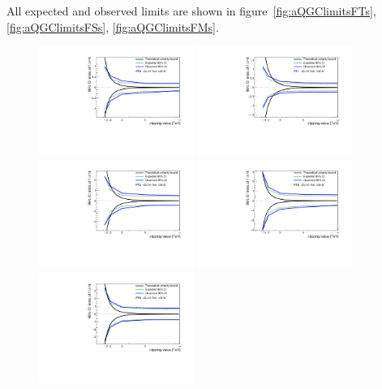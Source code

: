 All expected and observed limits are shown in figure~\ref{fig:aQGClimitsFTs}, \ref{fig:aQGClimitsFSs}, \ref{fig:aQGClimitsFMs}.
\begin{figure}[ht]
   \centering
   \includegraphics[width=0.45\textwidth]{figures/aQGC/FT0limit.pdf}
   \includegraphics[width=0.45\textwidth]{figures/aQGC/FT1limit.pdf}
   \includegraphics[width=0.45\textwidth]{figures/aQGC/FT2limit.pdf}
   \includegraphics[width=0.45\textwidth]{figures/aQGC/FT5limit.pdf}
   \includegraphics[width=0.45\textwidth]{figures/aQGC/FT6limit.pdf}

\end{figure}
